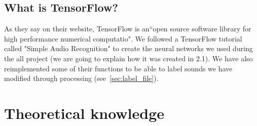 \documentclass[11pt,a4paper,titlepage]{report}
\begin{document}
\section{What is TensorFlow?}
\hspace*{0.6cm}
As they say on their website, TensorFlow is an``open source software library for high performance numerical computatio". We followed a TensorFlow tutorial called "Simple Audio Recognition" to create the neural networks we used during the all project (we are going to explain how it was created in 2.1). We have also reimplemented some of their functions to be able to label sounds we have modified through processing (see~\ref{sec:label_file}).
\chapter{Theoretical knowledge}
\end{document}
